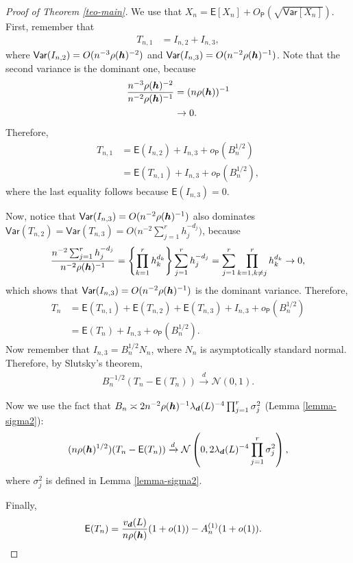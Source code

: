 \documentclass[oneside,11pt]{article}
\begin{document}
\begin{proof}[ Proof of Theorem \ref{teo-main}]
    We use that $X_n=\mathsf{E}[X_n]+O_{\mathsf{P}}(\sqrt{\mathsf{Var}[X_n]})$. First, remember that
    \begin{align*}
        T_{n,1} &= I_{n,2} + I_{n,3},
    \end{align*}
    where $\mathsf{Var}(I_{n,2}) = O(n^{-3} \rho ({\boldsymbol{h}})^{-2})$ and $\mathsf{Var}(I_{n,3}) = O(n^{-2} \rho ({\boldsymbol{h}})^{-1})$. Note that the second variance is the dominant one, because
    \begin{align*}
        \frac{n^{-3} \rho ({\boldsymbol{h}})^{-2}}{n^{-2} \rho ({\boldsymbol{h}})^{-1}} &= (n \rho ({\boldsymbol{h}}))^{-1} \\
        &\to 0.
    \end{align*}
    Therefore,
     \begin{align*}
        T_{n,1} 
        &= \mathsf{E} (I_{n,2}) + I_{n,3} + o_{\mathsf{P}}(B_n^{1/2}) \\
        &= \mathsf{E}(T_{n,1}) + I_{n,3} + o_{\mathsf{P}}(B_n^{1/2}),
    \end{align*}
    where the last equality follows because $\mathsf{E}(I_{n,3})=0$.

    Now, notice that $\mathsf{Var}(I_{n,3}) = O(n^{-2} \rho ({\boldsymbol{h}})^{-1})$ also dominates $\mathsf{Var} (T_{n,2}) = \mathsf{Var} (T_{n,3}) =  O \big(n^{-2} \sum_{j=1}^{r} h_j^{-d_j} \big)$, because 
    \begin{align*}
        \frac{n^{-2} \sum_{j=1}^{r} h_j^{-d_j}}{n^{-2} \rho ({\boldsymbol{h}})^{-1}}
        = \left\{\prod_{k=1}^{r} h_k^{d_k}\right\} \sum_{j=1}^{r} h_j^{-d_j} 
        = \sum_{j=1}^{r} \prod_{k=1,k \ne j}^{r} h_k^{d_k} 
        \to 0,
    \end{align*}
    which shows that $\mathsf{Var}(I_{n,3}) = O(n^{-2} \rho ({\boldsymbol{h}})^{-1})$ is the dominant variance. Therefore,
    \begin{align*}
        T_n 
        &= \mathsf{E}(T_{n,1})+\mathsf{E}(T_{n,2})+\mathsf{E}(T_{n,3}) + I_{n,3} + o_{\mathsf{P}}(B_n^{1/2}) \\
        &= \mathsf{E}(T_n) + I_{n,3} + o_{\mathsf{P}}(B_n^{1/2}).
    \end{align*}
    Now remember that $I_{n,3} = B_n^{1/2}N_n$, where $N_n$ is asymptotically standard normal. Therefore, by Slutsky's theorem,
    \begin{align*}
        B_n^{-1/2}(T_n - \mathsf{E}(T_n)) \xrightarrow{d} \mathcal{N}(0, 1).
    \end{align*}

    Now we use the fact that $ B_n \asymp 2 n^{-2} \rho({\boldsymbol{h}})^{-1} \lambda_{\boldsymbol{d}}(L)^{-4}  \prod_{j=1}^{r} \sigma_j^2$ (Lemma \ref{lemma-sigma2}):
    \begin{align*}
        (n \rho ({\boldsymbol{h}})^{1/2})(T_n - \mathsf{E}(T_n)) \xrightarrow{d} \mathcal{N} \left(0, 2 \lambda_{\boldsymbol{d}}(L)^{-4}  \prod_{j=1}^{r} \sigma_j^2\right),
    \end{align*}
    where $\sigma_j^2$ is defined in Lemma \ref{lemma-sigma2}.

    Finally,
    \begin{align*}
        \mathsf{E}(T_n)
        &= \frac{v_{\boldsymbol{d}}(L)}{n \rho ({\boldsymbol{h}})}(1+o(1)) - A_n^{(1)}(1+o(1)).
    \end{align*}
\end{proof}
\end{document}
